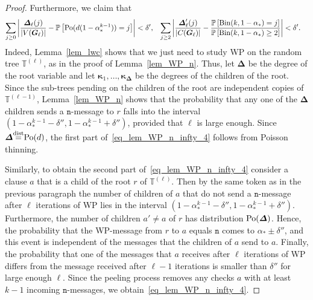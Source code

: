 \documentclass[10pt,reqno]{amsart}
\numberwithin{equation}{section}
\renewcommand{\vec}[1]{\boldsymbol{#1}}
\newcommand{\nll}{\mathtt{n}}
\newcommand\disteq{\stacksign{dist}{=}}
\newcommand{\TT}{\mathbb T}
\newcommand\vG{\vec G}
\newcommand{\Po}{{\rm Po}}
\newcommand{\Bin}{{\rm Bin}}
\newcommand\brk[1]{\left\lbrack{#1}\right\rbrack}
\newcommand\abs[1]{\left|{#1}\right|}
\newcommand{\stacksign}[2]{{\stackrel{\mbox{\scriptsize #1}}{#2}}}
\newcommand\pr{\mathbb{P}}
\newcommand\Lem{Lemma}
\def\pr{{\mathbb P}}
\begin{document}
\begin{proof}
	Furthermore, we claim that 
	\begin{align}\label{eq_lem_WP_n_infty_4}
		\sum_{j\geq0}\abs{\frac{\vec\Delta_\ell(j)}{|V(\vG_\ell)|}-\pr\brk{\Po(d(1-\alpha_*^{k-1}))=j}}&<\delta',&		\sum_{j\geq2}\abs{\frac{\vec\Delta'_\ell(j)}{|C(\vG_\ell)|}-\frac{\pr\brk{\Bin(k,1-\alpha_*)=j}}{\pr\brk{\Bin(k,1-\alpha_*)\geq2}}}&<\delta'.
	\end{align}
	Indeed, \Lem~\ref{lem_lwc} shows that we just need to study WP on the random tree $\TT^{(\ell)}$, as in the proof of \Lem~\ref{lem_WP_n}.
	Thus, let $\vec\Delta$ be the degree of the root variable and let $\vec\kappa_1,\ldots,\vec\kappa_{\vec\Delta}$ be the degrees of the children of the root.
	Since the sub-trees pending on the children of the root are independent copies of $\TT^{(\ell-1)}$, \Lem~\ref{lem_WP_n} shows that the probability that any one of the $\vec\Delta$ children sends a $\nll$-message to $r$ falls into the interval $(1-\alpha_*^{k-1}-\delta'',1-\alpha_*^{k-1}+\delta'')$, provided that $\ell$ is large enough.
	Since $\vec\Delta\disteq\Po(d)$, the first part of~\eqref{eq_lem_WP_n_infty_4} follows from Poisson thinning.

	Similarly, to obtain the second part of~\eqref{eq_lem_WP_n_infty_4} consider a clause $a$ that is a child of the root $r$ of $\TT^{(\ell)}$.
	Then by the same token as in the previous paragraph the number of children of $a$ that do not send a $\nll$-message after $\ell$ iterations of WP lies in the interval $(1-\alpha_*^{k-1}-\delta'',1-\alpha_*^{k-1}+\delta'')$.
	Furthermore, the number of children $a'\neq a$ of $r$ has distribution $\Po(\vec\Delta)$.
	Hence, the probability that the WP-message from $r$ to $a$ equals $\nll$ comes to $\alpha_*\pm\delta''$, and this event is independent of the messages that the children of $a$ send to $a$.
	Finally, the probability that one of the messages that $a$ receives after $\ell$ iterations of WP differs from the message received after $\ell-1$ iterations is smaller than $\delta''$ for large enough $\ell$.
	Since the peeling process removes any checks $a$ with at least $k-1$ incoming $\nll$-messages, we obtain~\eqref{eq_lem_WP_n_infty_4}.



\end{proof}
\end{document}
